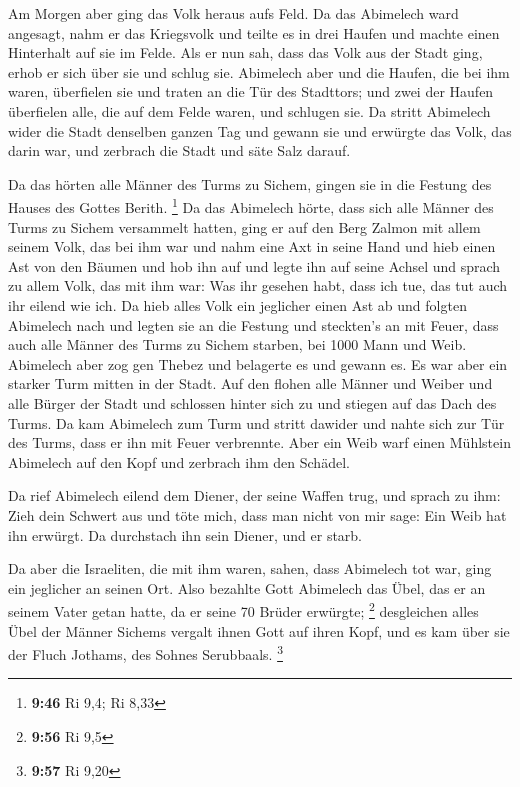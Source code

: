  Am Morgen aber ging das Volk heraus aufs Feld. Da das
Abimelech ward angesagt,  nahm er das Kriegsvolk und
teilte es in drei Haufen und machte einen Hinterhalt auf sie im Felde.
Als er nun sah, dass das Volk aus der Stadt ging, erhob er sich über sie
und schlug sie.  Abimelech aber und die Haufen, die bei
ihm waren, überfielen sie und traten an die Tür des Stadttors; und zwei
der Haufen überfielen alle, die auf dem Felde waren, und schlugen sie.
 Da stritt Abimelech wider die Stadt denselben ganzen Tag
und gewann sie und erwürgte das Volk, das darin war, und zerbrach die
Stadt und säte Salz darauf.

 Da das hörten alle Männer des Turms zu Sichem, gingen
sie in die Festung des Hauses des Gottes Berith. \footnote{\textbf{9:46}
  Ri 9,4; Ri 8,33}  Da das Abimelech hörte, dass sich
alle Männer des Turms zu Sichem versammelt hatten,  ging
er auf den Berg Zalmon mit allem seinem Volk, das bei ihm war und nahm
eine Axt in seine Hand und hieb einen Ast von den Bäumen und hob ihn auf
und legte ihn auf seine Achsel und sprach zu allem Volk, das mit ihm
war: Was ihr gesehen habt, dass ich tue, das tut auch ihr eilend wie
ich.  Da hieb alles Volk ein jeglicher einen Ast ab und
folgten Abimelech nach und legten sie an die Festung und steckten's an
mit Feuer, dass auch alle Männer des Turms zu Sichem starben, bei 1000
Mann und Weib.  Abimelech aber zog gen Thebez und
belagerte es und gewann es.  Es war aber ein starker Turm
mitten in der Stadt. Auf den flohen alle Männer und Weiber und alle
Bürger der Stadt und schlossen hinter sich zu und stiegen auf das Dach
des Turms.  Da kam Abimelech zum Turm und stritt dawider
und nahte sich zur Tür des Turms, dass er ihn mit Feuer verbrennte.
 Aber ein Weib warf einen Mühlstein Abimelech auf den
Kopf und zerbrach ihm den Schädel.

 Da rief Abimelech eilend dem Diener, der seine Waffen
trug, und sprach zu ihm: Zieh dein Schwert aus und töte mich, dass man
nicht von mir sage: Ein Weib hat ihn erwürgt. Da durchstach ihn sein
Diener, und er starb.

 Da aber die Israeliten, die mit ihm waren, sahen, dass
Abimelech tot war, ging ein jeglicher an seinen Ort. 
Also bezahlte Gott Abimelech das Übel, das er an seinem Vater getan
hatte, da er seine 70 Brüder erwürgte; \footnote{\textbf{9:56} Ri 9,5}
 desgleichen alles Übel der Männer Sichems vergalt ihnen
Gott auf ihren Kopf, und es kam über sie der Fluch Jothams, des Sohnes
Serubbaals. \footnote{\textbf{9:57} Ri 9,20}

